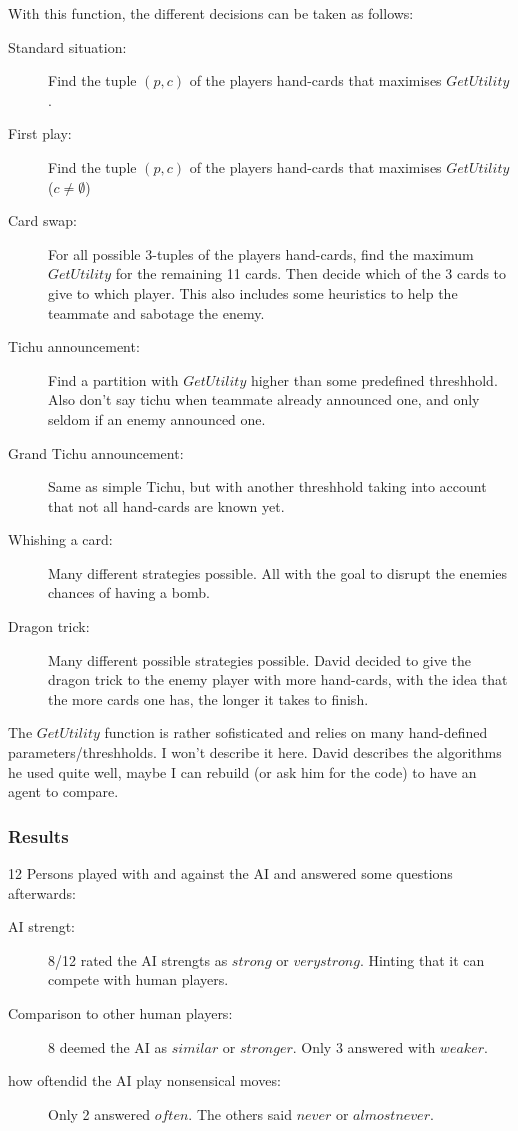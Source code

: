 \documentclass{article}
\begin{document}
With this function, the different decisions can be taken as follows:
\begin{description}
    \item[Standard situation:] Find the tuple $(p, c)$ of the players hand-cards that maximises $GetUtility$.
    \item[First play:]Find the tuple $(p, c)$ of the players hand-cards that maximises $GetUtility$ ($c \not = \emptyset$)
    \item[Card swap:] For all possible 3-tuples of the players hand-cards, find the maximum $GetUtility$ for the remaining 11 cards. Then decide which of the 3 cards to give to which player. This also includes some heuristics to help the teammate and sabotage the enemy.
    \item[Tichu announcement:] Find a partition with $GetUtility$ higher than some predefined threshhold. Also don't say tichu when teammate already announced one, and only seldom if an enemy announced one.
    \item[Grand Tichu announcement:] Same as simple Tichu, but with another threshhold taking into account that not all hand-cards are known yet.
    \item[Whishing a card:] Many different strategies possible. All with the goal to disrupt the enemies chances of having a bomb.
    \item[Dragon trick:]  Many different possible strategies possible. David decided to give the dragon trick to the enemy player with more hand-cards, with the idea that the more cards one has, the longer it takes to finish.

\end{description}

The $GetUtility$ function is rather sofisticated and relies on many hand-defined parameters/threshholds. I won't describe it here. David describes the algorithms he used quite well, maybe I can rebuild (or ask him for the code) to have an agent to compare.


\subsubsection*{Results}
12 Persons played with and against the AI and answered some questions afterwards:
\begin{description}
    \item[AI strengt:] 8/12 rated the AI strengts as $strong$ or $very strong$. Hinting that it can compete with human players.
    \item[Comparison to other human players:] 8 deemed the AI as $similar$ or $stronger$. Only 3 answered with $weaker$.
    \item[how oftendid the AI play nonsensical moves:] Only 2 answered $often$. The others said $never$ or $almost never$.
\end{description}
\end{document}

